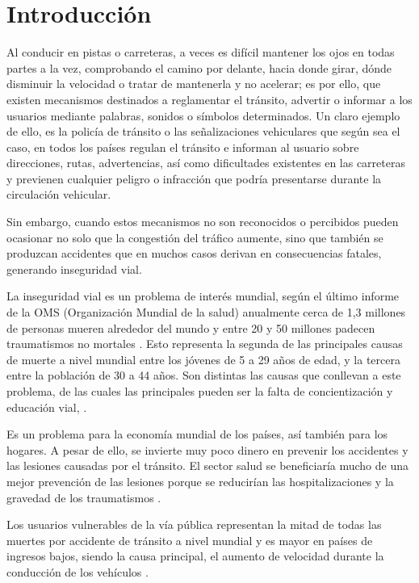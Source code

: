 \chapter{Introducción}
	\setcounter{page}{1}
	\renewcommand{\baselinestretch}{1} %
	Al conducir en pistas o carreteras, a veces es difícil mantener los ojos en todas partes a la vez, comprobando el camino por delante, hacia donde girar, dónde disminuir la velocidad o tratar de mantenerla y no acelerar; es por ello, que existen mecanismos destinados a reglamentar el tránsito, advertir o informar a los usuarios mediante palabras, sonidos o símbolos determinados. Un claro ejemplo de ello, es la policía de tránsito o las señalizaciones vehiculares que según sea el caso, en todos los países regulan el tránsito e informan al usuario sobre direcciones, rutas, advertencias, así como dificultades existentes en las carreteras y previenen cualquier peligro o infracción que podría presentarse durante la circulación vehicular.

	\vskip 0.15cm
	Sin embargo, cuando estos mecanismos no son reconocidos o percibidos pueden ocasionar no solo que la congestión del tráfico aumente, sino que también se produzcan accidentes que en muchos casos derivan en consecuencias fatales, generando inseguridad vial.

	\vskip 0.15cm
	La inseguridad vial es un problema de interés mundial, según el último informe de la OMS (Organización Mundial de la salud) anualmente cerca de 1,3 millones de personas mueren alrededor del mundo y entre 20 y 50 millones padecen traumatismos no mortales \citep{OMS}. Esto representa la segunda de las principales causas de muerte a nivel mundial entre los jóvenes de 5 a 29 años de edad, y la tercera entre la población de 30 a 44 años. Son distintas las causas que conllevan a este problema, de las cuales las principales pueden ser la falta de concientización y educación vial, \citep{OMS}. 
	
	\vskip 0.15cm	
	Es un problema para la economía mundial de los países, así también para los hogares. A pesar de ello, se invierte muy poco dinero en prevenir los accidentes y las lesiones causadas por el tránsito. El sector salud se beneficiaría mucho de una mejor prevención de las lesiones porque se reducirían las hospitalizaciones y la gravedad de los traumatismos \citep{CNSV}.

	\vskip 0.15cm
	Los usuarios vulnerables de la vía pública representan la mitad de todas las muertes por accidente de tránsito a nivel mundial y es mayor en países de ingresos bajos, siendo la causa principal, el aumento de velocidad durante la conducción de los vehículos \citep{OMS}.

